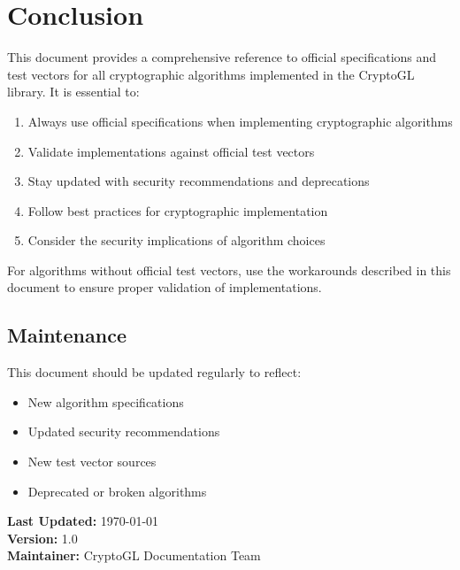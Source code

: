 \documentclass[12pt,a4paper]{article}
\begin{document}
\newpage

\section{Conclusion}

This document provides a comprehensive reference to official specifications and test vectors for all cryptographic algorithms implemented in the CryptoGL library. It is essential to:

\begin{enumerate}
    \item Always use official specifications when implementing cryptographic algorithms
    \item Validate implementations against official test vectors
    \item Stay updated with security recommendations and deprecations
    \item Follow best practices for cryptographic implementation
    \item Consider the security implications of algorithm choices
\end{enumerate}

For algorithms without official test vectors, use the workarounds described in this document to ensure proper validation of implementations.

\subsection{Maintenance}

This document should be updated regularly to reflect:
\begin{itemize}
    \item New algorithm specifications
    \item Updated security recommendations
    \item New test vector sources
    \item Deprecated or broken algorithms
\end{itemize}

\vspace{2cm}

\begin{center}
\textbf{Last Updated:} \today\\
\textbf{Version:} 1.0\\
\textbf{Maintainer:} CryptoGL Documentation Team
\end{center}
\end{document}

